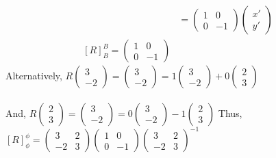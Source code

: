 \documentclass[letterpaper,12pt]{article}
\begin{document}
\begin{example}
\begin{align*}
    & = \begin{pmatrix} 1 & 0 \\ 0 & -1 \end{pmatrix} \begin{pmatrix} x' \\ y' \end{pmatrix} \\
    [R]_B^B = \begin{pmatrix} 1 & 0 \\ 0 & -1 \end{pmatrix}
\end{align*}
Alternatively, $R\begin{pmatrix} 3 \\ -2 \end{pmatrix} = \begin{pmatrix} 3 \\ -2 \end{pmatrix} = 1 \begin{pmatrix} 3 \\ -2 \end{pmatrix} + 0 \begin{pmatrix} 2 \\ 3 \end{pmatrix}$
\\ \\ And, $R\begin{pmatrix} 2 \\ 3 \end{pmatrix} = \begin{pmatrix} 3 \\ -2 \end{pmatrix} = 0 \begin{pmatrix} 3 \\ -2 \end{pmatrix} -1 \begin{pmatrix} 2 \\ 3 \end{pmatrix}$
Thus,
$[R]_{\phi}^{\phi} = \begin{pmatrix} 3 & 2 \\ -2 & 3 \end{pmatrix} \begin{pmatrix} 1 & 0 \\ 0 & -1 \end{pmatrix} \begin{pmatrix} 3 & 2 \\ -2 & 3 \end{pmatrix}^{-1}$
\end{example}
\end{document}
